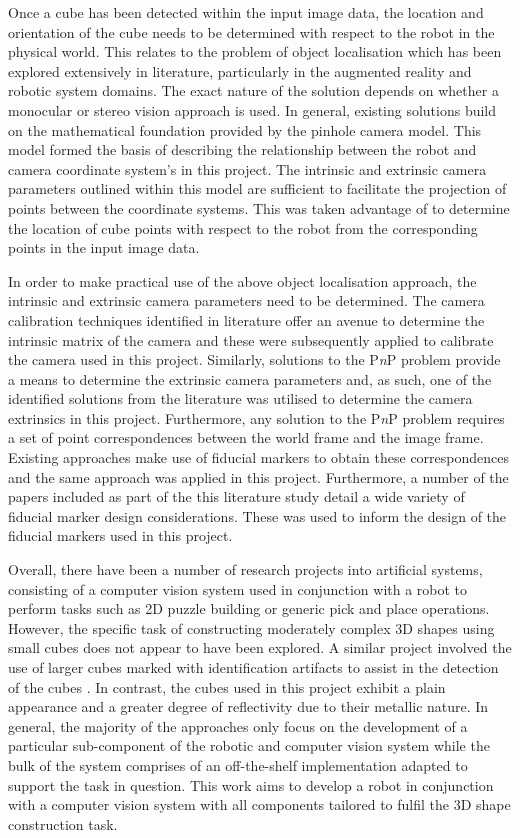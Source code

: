 Once a cube has been detected within the input image data, the location and orientation of the cube needs to be determined with respect to the robot in the physical world. This relates to the problem of object localisation which has been explored extensively in literature, particularly in the augmented reality and robotic system domains. The exact nature of the solution depends on whether a monocular or stereo vision approach is used. In general, existing solutions build on the mathematical foundation provided by the pinhole camera model. This model formed the basis of describing the relationship between the robot and camera coordinate system's in this project. The intrinsic and extrinsic camera parameters outlined within this model are sufficient to facilitate the projection of points between the coordinate systems. This was taken advantage of to determine the location of cube points with respect to the robot from the corresponding points in the input image data.

In order to make practical use of the above object localisation approach, the intrinsic and extrinsic camera parameters need to be determined. The camera calibration techniques identified in literature offer an avenue to determine the intrinsic matrix of the camera and these were subsequently applied to calibrate the camera used in this project. Similarly, solutions to the P\textit{n}P problem provide a means to determine the extrinsic camera parameters and, as such, one of the identified solutions from the literature was utilised to determine the camera extrinsics in this project. Furthermore, any solution to the P\textit{n}P problem requires a set of point correspondences between the world frame and the image frame. Existing approaches make use of fiducial markers to obtain these correspondences and the same approach was applied in this project. Furthermore, a number of the papers included as part of the this literature study detail a wide variety of fiducial marker design considerations. These was used to inform the design of the fiducial markers used in this project.

Overall, there have been a number of research projects into artificial systems, consisting of a computer vision system used in conjunction with a robot to perform tasks such as 2D puzzle building or generic pick and place operations. However, the specific task of constructing moderately complex 3D shapes using small cubes does not appear to have been explored. A similar project involved the use of larger cubes marked with identification artifacts to assist in the detection of the cubes \cite{Lin:Character_Cube_Stacking_Robot}. In contrast, the cubes used in this project exhibit a plain appearance and a greater degree of reflectivity due to their metallic nature. In general, the majority of the approaches only focus on the development of a particular sub-component of the robotic and computer vision system while the bulk of the system comprises of an off-the-shelf implementation adapted to support the task in question. This work aims to develop a robot in conjunction with a computer vision system with all components tailored to fulfil the 3D shape construction task.

\newpage


